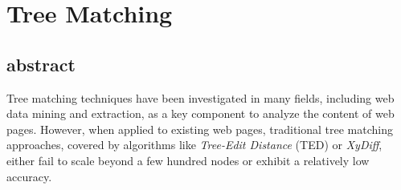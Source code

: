 \chapter{Tree Matching}
\section{abstract}
Tree matching techniques have been investigated in many fields, including web data mining and extraction, as a key component to analyze the content of web pages.
However, when applied to existing web pages, traditional tree matching approaches, covered by algorithms like \emph{Tree-Edit Distance} (TED) or \emph{XyDiff}, either fail to scale beyond a few hundred nodes or exhibit a relatively low accuracy.

